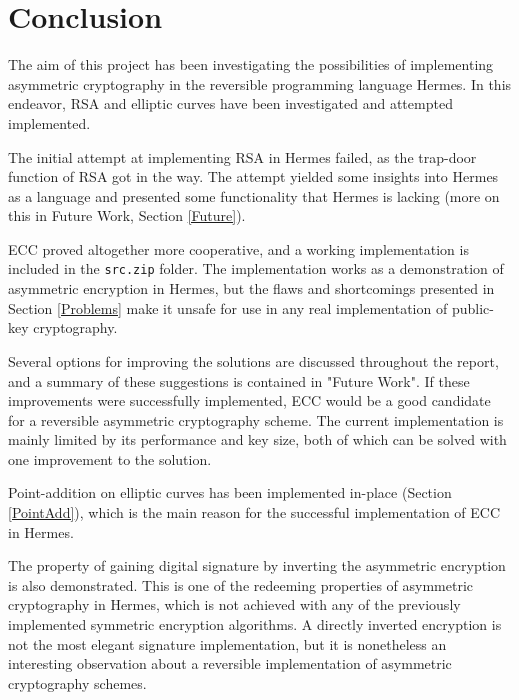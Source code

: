 

\chapter{Conclusion}
The aim of this project has been investigating the possibilities of implementing asymmetric cryptography in the reversible programming language Hermes. In this endeavor, RSA and elliptic curves have been investigated and attempted implemented.

The initial attempt at implementing RSA in Hermes failed, as the trap-door function of RSA got in the way. The attempt yielded some insights into Hermes as a language and presented some functionality that Hermes is lacking (more on this in Future Work, Section \ref{Future}).

ECC proved altogether more cooperative, and a working implementation is included in the \texttt{src.zip} folder. The implementation works as a demonstration of asymmetric encryption in Hermes, but the flaws and shortcomings presented in Section \ref{Problems} make it unsafe for use in any real implementation of public-key cryptography.

Several options for improving the solutions are discussed throughout the report, and a summary of these suggestions is contained in "Future Work". If these improvements were successfully implemented, ECC would be a good candidate for a reversible asymmetric cryptography scheme. The current implementation is mainly limited by its performance and key size, both of which can be solved with one improvement to the solution.

Point-addition on elliptic curves has been implemented in-place (Section \ref{PointAdd}), which is the main reason for the successful implementation of ECC in Hermes. 

The property of gaining digital signature by inverting the asymmetric encryption is also demonstrated. This is one of the redeeming properties of asymmetric cryptography in Hermes, which is not achieved with any of the previously implemented symmetric encryption algorithms. A directly inverted encryption is not the most elegant signature implementation, but it is nonetheless an interesting observation about a reversible implementation of asymmetric cryptography schemes. 

